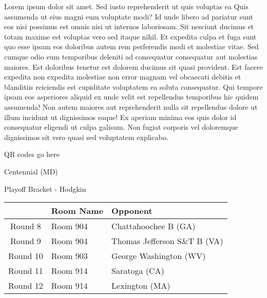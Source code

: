\documentclass{article}%
\begin{document}
\vspace*{8pt}%
\linebreak%
\newline%
\newline%
Lorem ipsum dolor sit amet. Sed iusto reprehenderit ut quis voluptas ea Quis assumenda ut eius magni eum voluptate modi? Id unde libero ad pariatur sunt eos nisi possimus est omnis nisi ut internos laboriosam. Sit nesciunt ducimus et totam maxime est voluptas vero sed itaque nihil. Et expedita culpa et fuga sunt quo esse ipsam eos doloribus autem rem perferendis modi et molestiae vitae.\newline%
\newline%
Sed cumque odio eum temporibus deleniti ad consequatur consequatur aut molestias maiores. Est doloribus tenetur est dolorem ducimus sit quasi provident. Est facere expedita non expedita molestiae non error magnam vel obcaecati debitis et blanditiis reiciendis est cupiditate voluptatem ea soluta consequatur. Qui tempore ipsam eos asperiores aliquid ex unde velit est repellendus temporibus hic quidem assumenda!\newline%
\newline%
Non autem maiores aut reprehenderit nulla sit repellendus dolore ut illum incidunt ut dignissimos eaque! Ex aperiam minima eos quis dolor id consequatur eligendi ut culpa galisum. Non fugiat corporis vel doloremque dignissimos sit vero quasi sed voluptatem explicabo.\newline%
\newline%
%
\vspace*{30pt}%
\begin{center}%
\begin{Huge}%
QR codes go here%
\end{Huge}%
\end{center}%
\newpage%
\begin{center}%
\begin{Huge}%
Centennial (MD)%
\end{Huge}%
\vspace*{8pt}%
\linebreak%
\begin{Large}%
Playoff Bracket {-} Hodgkin%
\end{Large}%
\end{center}%
%
\begin{tabularx}{\textwidth}{|c|Y|Y|}%
\hline%
&Room Name&Opponent\\%
\hline%
Round 8&Room 904&Chattahoochee B (GA)\\%
Round 9&Room 904&Thomas Jefferson S\&T B (VA)\\%
Round 10&Room 903&George Washington (WV)\\%
Round 11&Room 914&Saratoga (CA)\\%
Round 12&Room 914&Lexington (MA)\\%
\hline%
\end{tabularx}%
\end{document}
